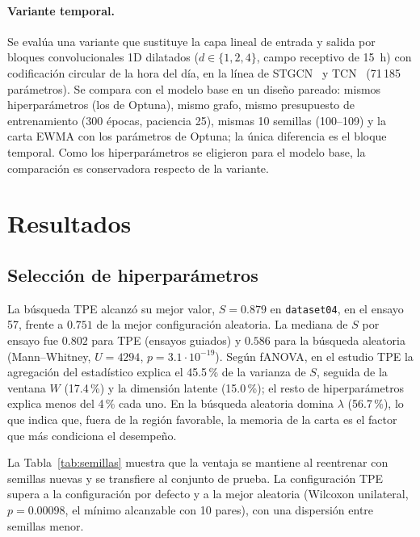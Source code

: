 \documentclass[11pt,a4paper]{article}
\begin{document}
\paragraph{Variante temporal.} Se evalúa una variante que sustituye la capa lineal de
entrada y salida por bloques convolucionales 1D dilatados ($d\in\{1,2,4\}$, campo
receptivo de 15~h) con codificación circular de la hora del día, en la línea de
STGCN~\cite{yu2018} y TCN~\cite{bai2018} (71\,185 parámetros). Se compara con el modelo
base en un diseño pareado: mismos hiperparámetros (los de Optuna), mismo grafo, mismo
presupuesto de entrenamiento (300 épocas, paciencia 25), mismas 10 semillas
(100--109) y la carta EWMA con los parámetros de Optuna; la única diferencia es el
bloque temporal. Como los hiperparámetros se eligieron para el modelo base, la
comparación es conservadora respecto de la variante.

\section{Resultados}

\subsection{Selección de hiperparámetros}

La búsqueda TPE alcanzó su mejor valor, $S=0.879$ en \texttt{dataset04}, en el ensayo
57, frente a $0.751$ de la mejor configuración aleatoria. La mediana de $S$ por ensayo
fue $0.802$ para TPE (ensayos guiados) y $0.586$ para la búsqueda aleatoria
(Mann--Whitney, $U=4294$, $p=3.1\cdot10^{-19}$). Según fANOVA, en el estudio TPE la
agregación del estadístico explica el 45.5\,\% de la varianza de $S$, seguida de la
ventana $W$ (17.4\,\%) y la dimensión latente (15.0\,\%); el resto de
hiperparámetros explica menos del 4\,\% cada uno. En la búsqueda aleatoria domina
$\lambda$ (56.7\,\%), lo que indica que, fuera de la región favorable, la memoria de
la carta es el factor que más condiciona el desempeño.

La Tabla~\ref{tab:semillas} muestra que la ventaja se mantiene al reentrenar con
semillas nuevas y se transfiere al conjunto de prueba. La configuración TPE supera a
la configuración por defecto y a la mejor aleatoria (Wilcoxon unilateral,
$p=0.00098$, el mínimo alcanzable con 10 pares), con una dispersión entre semillas
menor.
\end{document}
